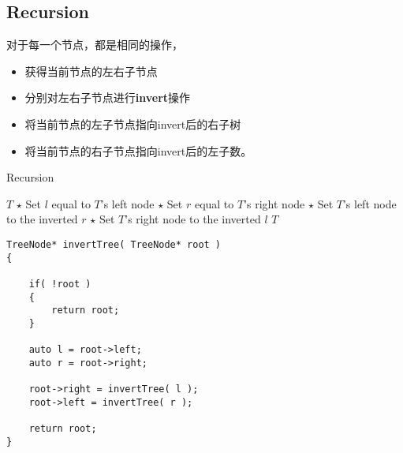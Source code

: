 \subsection{Recursion}
\begin{CJK*}{UTF8}{gbsn}
对于每一个节点，都是相同的操作，
\begin{itemize}
\item 获得当前节点的左右子节点
\item 分别对左右子节点进行\textbf{invert}操作
\item 将当前节点的左子节点指向invert后的右子树
\item 将当前节点的右子节点指向invert后的左子数。
\end{itemize}
\end{CJK*}
\setcounter{algorithm}{0}
\begin{algorithm}[H]
\caption{Recursion}
\begin{algorithmic}[1]
\State \Return $T$
\EndIf
\State $\star$ Set $l$ equal to $T$'s left node
\State $\star$ Set $r$ equal to $T$'s right node
\State $\star$ Set $T$'s left node to the inverted $r$
\State $\star$ Set $T$'s right node to the inverted $l$
\State \Return $T$
\EndProcedure
\end{algorithmic}
\end{algorithm}
\setcounter{lstlisting}{0}
\begin{lstlisting}[style=customc, caption={Recursion}]
TreeNode* invertTree( TreeNode* root )
{

    if( !root )
    {
        return root;
    }

    auto l = root->left;
    auto r = root->right;

    root->right = invertTree( l );
    root->left = invertTree( r );

    return root;
}
\end{lstlisting}